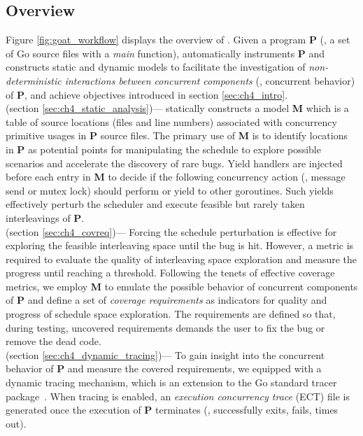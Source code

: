 \subsection{Overview}
\label{sec:ch4_overview}
Figure \ref{fig:goat_workflow} displays the overview of \goat.
%
Given a program \textbf{P} (\ie, a set of Go source files with a \textit{main} function), \goat automatically instruments \textbf{P} and constructs static and dynamic models to facilitate the investigation of \textit{non-deterministic interactions between concurrent components} (\ie, concurrent behavior) of \textbf{P}, and achieve objectives introduced in section \ref{sec:ch4_intro}.
%
\\
 (section \ref{sec:ch4_static_analysis})---
\goat statically constructs a model \textbf{M} which is a table of source locations (files and line numbers) associated with concurrency primitive usages in \textbf{P} source files.
%
The primary use of \textbf{M} is to identify locations in \textbf{P} as potential points for manipulating the schedule to explore possible scenarios and accelerate the discovery of rare bugs.
%
Yield handlers are injected before each entry in \textbf{M} to decide if the following concurrency action (\eg, message send or mutex lock) should perform or yield to other goroutines.
%
Such yields effectively perturb the scheduler and execute feasible but rarely taken interleavings of \textbf{P}.
%
\\
 (section \ref{sec:ch4_covreq})---
Forcing the schedule perturbation is effective for exploring the feasible interleaving space until the bug is hit.
%
However, a metric is required to evaluate the quality of interleaving space exploration and measure the progress until reaching a threshold.
%
Following the tenets of effective coverage metrics, we employ \textbf{M} to emulate the possible behavior of concurrent components of \textbf{P} and define a set of \textit{coverage requirements} as indicators for quality and progress of schedule space exploration.
%
The requirements are defined so that, during testing, uncovered requirements demands the user to fix the bug or remove the dead code.
\\
 (section \ref{sec:ch4_dynamic_tracing})---
To gain insight into the concurrent behavior of \textbf{P} and measure the covered requirements, we equipped \goat with a dynamic tracing mechanism, which is an extension to the Go standard tracer package~\cite{go-cmd-trace}.
%
When tracing is enabled, an \textit{execution concurrency trace} (ECT) file is generated once the execution of \textbf{P} terminates (\eg, successfully exits, fails, times out).
